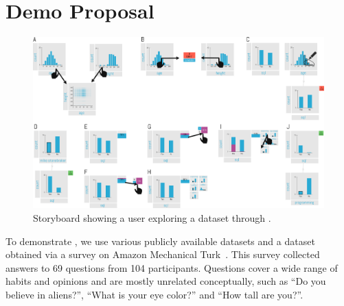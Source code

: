 \section{Demo Proposal}
\label{sec:scenarios}

\begin{figure}[ht]
\center
\includegraphics[width=\textwidth]{figures/storyboard.pdf}
\caption{Storyboard showing a user exploring a dataset through \system{}.}
\label{fig:sb}
\vspace{-4ex}
\end{figure}

To demonstrate \system{}, we use various publicly available datasets and a dataset obtained via a survey on Amazon Mechanical Turk~\cite{binnig2017sustainable}. This survey collected answers to 69 questions from 104 participants. Questions cover a wide range of habits and opinions and are mostly unrelated conceptually, such as ``Do you believe in aliens?'',  ``What is your eye color?'' and ``How tall are you?''. 

